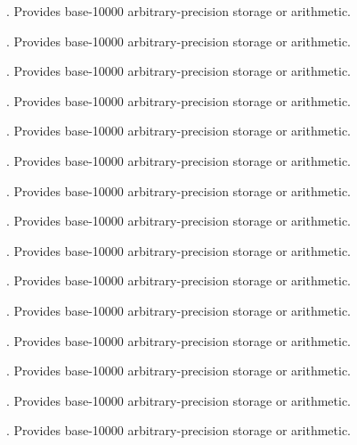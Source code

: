 \begin{description}
\item[\texttt{}] \texttt{}. Provides base-10000 arbitrary-precision storage or arithmetic.
\item[\texttt{}] \texttt{}. Provides base-10000 arbitrary-precision storage or arithmetic.
\item[\texttt{}] \texttt{}. Provides base-10000 arbitrary-precision storage or arithmetic.
\item[\texttt{}] \texttt{}. Provides base-10000 arbitrary-precision storage or arithmetic.
\item[\texttt{}] \texttt{}. Provides base-10000 arbitrary-precision storage or arithmetic.
\item[\texttt{}] \texttt{}. Provides base-10000 arbitrary-precision storage or arithmetic.
\item[\texttt{}] \texttt{}. Provides base-10000 arbitrary-precision storage or arithmetic.
\item[\texttt{}] \texttt{}. Provides base-10000 arbitrary-precision storage or arithmetic.
\item[\texttt{}] \texttt{}. Provides base-10000 arbitrary-precision storage or arithmetic.
\item[\texttt{}] \texttt{}. Provides base-10000 arbitrary-precision storage or arithmetic.
\item[\texttt{}] \texttt{}. Provides base-10000 arbitrary-precision storage or arithmetic.
\item[\texttt{}] \texttt{}. Provides base-10000 arbitrary-precision storage or arithmetic.
\item[\texttt{}] \texttt{}. Provides base-10000 arbitrary-precision storage or arithmetic.
\item[\texttt{}] \texttt{}. Provides base-10000 arbitrary-precision storage or arithmetic.
\item[\texttt{}] \texttt{}. Provides base-10000 arbitrary-precision storage or arithmetic.

\end{description}

